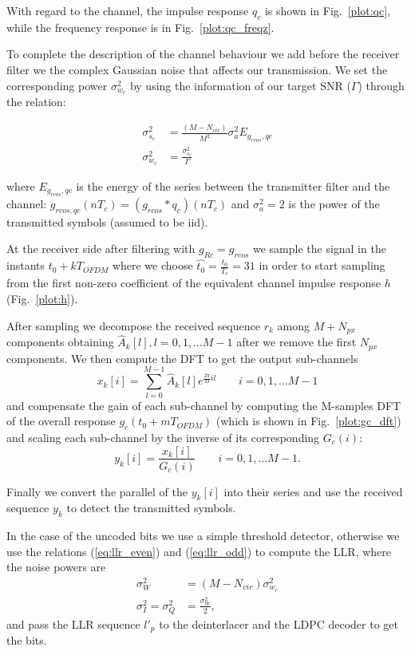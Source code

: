 \documentclass[a4paper,oneside]{article}
\begin{document}
With regard to the channel, the impulse response $q_c$ is shown in Fig.~\ref{plot:qc}, while the frequency response is in Fig.~\ref{plot:qc_freqz}.

To complete the description of the channel behaviour we add before the receiver filter we the complex Gaussian noise that affects our transmission. We set the corresponding power $\sigma_{w_c}^2$ by using the information of our target SNR ($\Gamma$) through the relation:

\begin{align}
  \sigma^2_{s_c} &= \frac{(M-N_{vir})}{M^2}\sigma_{a}^2 E_{g_{rcos},qc} \\
\sigma_{w_c}^2 &= \frac{\sigma^2_{s_c}}{\Gamma}
\label{eq:var_OFDM}
\end{align}

where $E_{g_{rcos},qc}$ is the energy of the series between the transmitter filter and the channel: $g_{rcos,qc}(nT_c) = \left(g_{rcos}*q_c\right)(nT_c)$ and $\sigma_a^2 = 2$ is the power of the transmitted symbols (assumed to be iid).

At the receiver side after filtering with $g_{Rc} = g_{rcos}$ we sample the signal in the instants $t_0 + kT_{OFDM}$ where we choose $\hat{t_0} = \frac{t_0}{T_c} = 31$ in order to start sampling from the first non-zero coefficient of the equivalent channel impulse response $h$ (Fig.~\ref{plot:h}).

After sampling we decompose the received sequence $r_k$ among $M+N_{px}$ components obtaining $\hat{A}_k[l], l = 0,1,\dots M-1$ after we remove the first $N_{px}$ components. We then compute the DFT to get the output sub-channels
\begin{equation}
  x_k[i] = \sum_{l=0}^{M-1}\hat{A}_k[l]e^{\frac{2\pi}{M}il} \qquad i=0,1,\dots M-1
\end{equation}
and compensate the gain of each sub-channel by computing the M-samples
DFT of the overall response $g_c(t_0 + mT_{OFDM})$ (which is shown in
Fig.~\ref{plot:gc_dft}) and scaling each sub-channel by the inverse of
its corresponding $G_c(i)$:
\begin{equation}
  y_k[i] = \frac{x_k[i]}{G_c(i)} \qquad i=0,1,\dots M-1 .
\end{equation}

Finally we convert the parallel of the $y_k[i]$ into their series and use the received sequence $y_k$ to detect the transmitted symbols.

In the case of the uncoded bits we use a simple threshold detector,
otherwise we use the relations (\ref{eq:llr_even}) and
(\ref{eq:llr_odd}) to compute the LLR, where the noise powers are
\begin{align}
  \sigma_W^2 &= (M-N_{vir})\sigma^2_{w_c} \\
  \sigma^2_I = \sigma^2_Q &= \frac{\sigma_W^2}{2} ,
\end{align}
and pass the LLR sequence $l'_p$ to the deinterlacer and the LDPC
decoder to get the bits.
\end{document}
